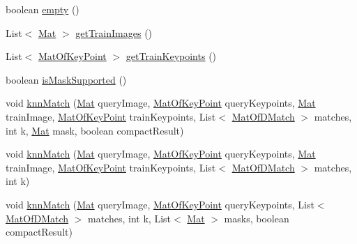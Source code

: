 \begin{DoxyCompactItemize}
\item 
boolean \mbox{\hyperlink{classorg_1_1opencv_1_1features2d_1_1_generic_descriptor_matcher_a9abc040599bc74e5b3d877d393ab58a0}{empty}} ()
\item 
List$<$ \mbox{\hyperlink{classorg_1_1opencv_1_1core_1_1_mat}{Mat}} $>$ \mbox{\hyperlink{classorg_1_1opencv_1_1features2d_1_1_generic_descriptor_matcher_a016fab98a353a2e823130d7b0d6668c3}{get\+Train\+Images}} ()
\item 
List$<$ \mbox{\hyperlink{classorg_1_1opencv_1_1core_1_1_mat_of_key_point}{Mat\+Of\+Key\+Point}} $>$ \mbox{\hyperlink{classorg_1_1opencv_1_1features2d_1_1_generic_descriptor_matcher_a334b393c4b8d79b117797ddc5dfcd940}{get\+Train\+Keypoints}} ()
\item 
boolean \mbox{\hyperlink{classorg_1_1opencv_1_1features2d_1_1_generic_descriptor_matcher_aaeb65b1ba87c1babb2d37fa7f2f4fa71}{is\+Mask\+Supported}} ()
\item 
void \mbox{\hyperlink{classorg_1_1opencv_1_1features2d_1_1_generic_descriptor_matcher_af6815bbb6335022c81da415b79da82e7}{knn\+Match}} (\mbox{\hyperlink{classorg_1_1opencv_1_1core_1_1_mat}{Mat}} query\+Image, \mbox{\hyperlink{classorg_1_1opencv_1_1core_1_1_mat_of_key_point}{Mat\+Of\+Key\+Point}} query\+Keypoints, \mbox{\hyperlink{classorg_1_1opencv_1_1core_1_1_mat}{Mat}} train\+Image, \mbox{\hyperlink{classorg_1_1opencv_1_1core_1_1_mat_of_key_point}{Mat\+Of\+Key\+Point}} train\+Keypoints, List$<$ \mbox{\hyperlink{classorg_1_1opencv_1_1core_1_1_mat_of_d_match}{Mat\+Of\+D\+Match}} $>$ matches, int k, \mbox{\hyperlink{classorg_1_1opencv_1_1core_1_1_mat}{Mat}} mask, boolean compact\+Result)
\item 
void \mbox{\hyperlink{classorg_1_1opencv_1_1features2d_1_1_generic_descriptor_matcher_ab8a37a7d1349e7c3bfc7d26f51c065b5}{knn\+Match}} (\mbox{\hyperlink{classorg_1_1opencv_1_1core_1_1_mat}{Mat}} query\+Image, \mbox{\hyperlink{classorg_1_1opencv_1_1core_1_1_mat_of_key_point}{Mat\+Of\+Key\+Point}} query\+Keypoints, \mbox{\hyperlink{classorg_1_1opencv_1_1core_1_1_mat}{Mat}} train\+Image, \mbox{\hyperlink{classorg_1_1opencv_1_1core_1_1_mat_of_key_point}{Mat\+Of\+Key\+Point}} train\+Keypoints, List$<$ \mbox{\hyperlink{classorg_1_1opencv_1_1core_1_1_mat_of_d_match}{Mat\+Of\+D\+Match}} $>$ matches, int k)
\item 
void \mbox{\hyperlink{classorg_1_1opencv_1_1features2d_1_1_generic_descriptor_matcher_a4f5cf4fe824db96ba3b9a038a4925a23}{knn\+Match}} (\mbox{\hyperlink{classorg_1_1opencv_1_1core_1_1_mat}{Mat}} query\+Image, \mbox{\hyperlink{classorg_1_1opencv_1_1core_1_1_mat_of_key_point}{Mat\+Of\+Key\+Point}} query\+Keypoints, List$<$ \mbox{\hyperlink{classorg_1_1opencv_1_1core_1_1_mat_of_d_match}{Mat\+Of\+D\+Match}} $>$ matches, int k, List$<$ \mbox{\hyperlink{classorg_1_1opencv_1_1core_1_1_mat}{Mat}} $>$ masks, boolean compact\+Result)

\end{DoxyCompactItemize}

